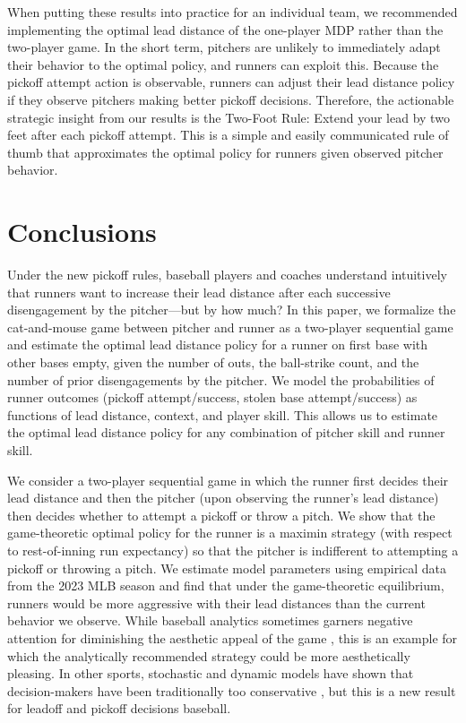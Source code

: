 \documentclass[11pt]{article}
\begin{document}
    When putting these results into practice for an individual team, we recommended implementing the optimal lead distance of the one-player MDP rather than the two-player game. In the short term, pitchers are unlikely to immediately adapt their behavior to the optimal policy, and runners can exploit this. Because the pickoff attempt action is observable, runners can adjust their lead distance policy if they observe pitchers making better pickoff decisions. Therefore, the actionable strategic insight from our results is the Two-Foot Rule: Extend your lead by two feet after each pickoff attempt. This is a simple and easily communicated rule of thumb that approximates the optimal policy for runners given observed pitcher behavior.
    
  \section{Conclusions}

    Under the new pickoff rules, baseball players and coaches understand intuitively that runners want to increase their lead distance after each successive disengagement by the pitcher---but by how much? In this paper, we formalize the cat-and-mouse game between pitcher and runner as a two-player sequential game and estimate the optimal lead distance policy for a runner on first base with other bases empty, given the number of outs, the ball-strike count, and the number of prior disengagements by the pitcher. We model the probabilities of runner outcomes (pickoff attempt/success, stolen base attempt/success) as functions of lead distance, context, and player skill. This allows us to estimate the optimal lead distance policy for any combination of pitcher skill and runner skill.

    We consider a two-player sequential game in which the runner first decides their lead distance and then the pitcher (upon observing the runner's lead distance) then decides whether to attempt a pickoff or throw a pitch. We show that the game-theoretic optimal policy for the runner is a maximin strategy (with respect to rest-of-inning run expectancy) so that the pitcher is indifferent to attempting a pickoff or throwing a pitch. We estimate model parameters using empirical data from the 2023 MLB season and find that under the game-theoretic equilibrium, runners would be more aggressive with their lead distances than the current behavior we observe. While baseball analytics sometimes garners negative attention for diminishing the aesthetic appeal of the game \parencite{sheinin_analytics_2025}, this is an example for which the analytically recommended strategy could be more aesthetically pleasing. In other sports, stochastic and dynamic models have shown that decision-makers have been traditionally too conservative \parencite{romer_firms_2006, beaudoin_strategies_2010, yam_what_2019}, but this is a new result for leadoff and pickoff decisions baseball.
\end{document}
